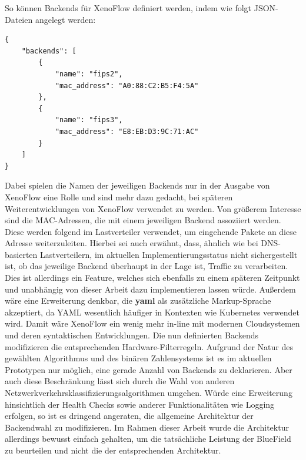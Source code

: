 So können Backends für XenoFlow definiert werden, indem wie folgt JSON-Dateien angelegt werden:
\begin{verbatim}
{
    "backends": [
        {
            "name": "fips2",
            "mac_address": "A0:88:C2:B5:F4:5A"
        },
        {
            "name": "fips3",
            "mac_address": "E8:EB:D3:9C:71:AC"
        }
    ] 
}
\end{verbatim}
Dabei spielen die Namen der jeweiligen Backends nur in der Ausgabe von XenoFlow eine Rolle und sind mehr dazu gedacht, bei späteren Weiterentwicklungen von XenoFlow verwendet zu werden. Von größerem Interesse sind die MAC-Adressen, die mit einem jeweiligen Backend assoziiert werden. Diese werden folgend im Lastverteiler verwendet, um eingehende Pakete an diese Adresse weiterzuleiten. Hierbei sei auch erwähnt, dass, ähnlich wie bei DNS-basierten Lastverteilern, im aktuellen Implementierungsstatus nicht sichergestellt ist, ob das jeweilige Backend überhaupt in der Lage ist, Traffic zu verarbeiten. Dies ist allerdings ein Feature, welches sich ebenfalls zu einem späteren Zeitpunkt und unabhängig von dieser Arbeit dazu implementieren lassen würde. Außerdem wäre eine Erweiterung denkbar, die \textbf{yaml} als zusätzliche Markup-Sprache akzeptiert, da YAML wesentlich häufiger in Kontexten wie Kubernetes verwendet wird. Damit wäre XenoFlow ein wenig mehr in-line mit modernen Cloudsystemen und deren syntaktischen Entwicklungen.
\newline
Die nun definierten Backends modifizieren die entsprechenden Hardware-Filterregeln. Aufgrund der Natur des gewählten Algorithmus und des binären Zahlensystems ist es im aktuellen Prototypen nur möglich, eine gerade Anzahl von Backends zu deklarieren. Aber auch diese Beschränkung lässt sich durch die Wahl von anderen Netzwerkverkehrsklassifizierungsalgorithmen umgehen. Würde eine Erweiterung hinsichtlich der Health Checks sowie anderer Funktionalitäten wie Logging erfolgen, so ist es dringend angeraten, die allgemeine Architektur der Backendwahl zu modifizieren. Im Rahmen dieser Arbeit wurde die Architektur allerdings bewusst einfach gehalten, um die tatsächliche Leistung der BlueField zu beurteilen und nicht die der entsprechenden Architektur.
